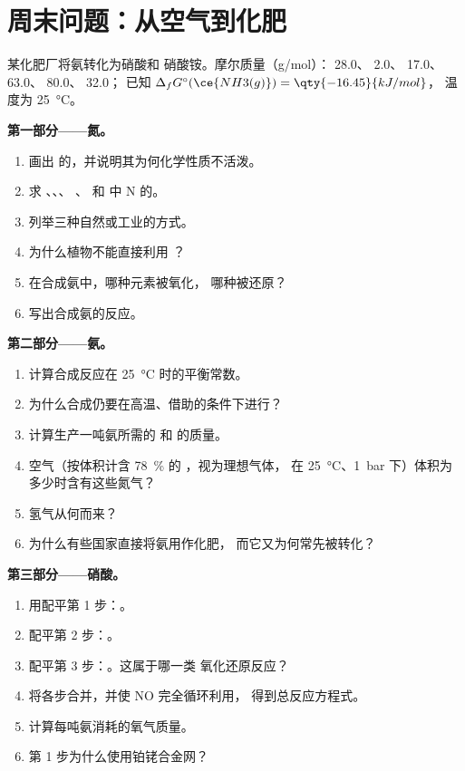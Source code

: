 \section{周末问题：从空气到化肥}

\begin{problem}
\label{pb:b1:p-block-13-15:1}
某化肥厂将氨转化为硝酸和
硝酸铵。摩尔质量（\unit{g/mol}）： 28.0、 2.0、
17.0、 63.0、 80.0、 32.0；
已知 $\Delta_f G^\circ(\ce{NH3(g)}) = \qty{-16.45}{kJ/mol}$，
温度为 \qty{25}{\celsius}。

\medskip
\noindent\textbf{第一部分——氮。}
\begin{enumerate}
  \item 画出  的，并说明其为何化学性质不活泼。
  \item 求 、、、
        、 和  中 N 的。
  \item 列举三种自然或工业的方式。
  \item 为什么植物不能直接利用 ？
  \item 在合成氨中，哪种元素被氧化，
        哪种被还原？
  \item 写出合成氨的反应。
\end{enumerate}

\medskip
\noindent\textbf{第二部分——氨。}
\begin{enumerate}[resume]
  \item 计算合成反应在
        \qty{25}{\celsius} 时的平衡常数。
  \item 为什么合成仍要在高温、借助的条件下进行？
  \item 计算生产一吨氨所需的  和 
        的质量。
  \item 空气（按体积计含 \qty{78}{\percent} 的 ，视为理想气体，
        在 \qty{25}{\celsius}、\qty{1}{bar} 下）体积为多少时含有这些氮气？
  \item 氢气从何而来？
  \item 为什么有些国家直接将氨用作化肥，
        而它又为何常先被转化？
\end{enumerate}

\medskip
\noindent\textbf{第三部分——硝酸。}
\begin{enumerate}[resume]
  \item 用配平第 1 步：。 %
  \item 配平第 2 步：。 %
  \item 配平第 3 步：。这属于哪一类 %
        氧化还原反应？
  \item 将各步合并，并使 NO 完全循环利用，
        得到总反应方程式。
  \item 计算每吨氨消耗的氧气质量。
  \item 第 1 步为什么使用铂铑合金网？
\end{enumerate}


\end{problem}
